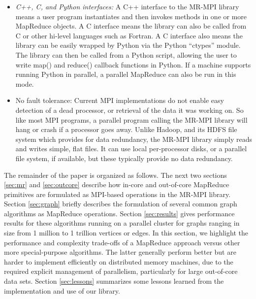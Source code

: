 \begin{itemize}
\item {\it C++, C, and Python interfaces:} A C++ interface to the
MR-MPI library means a user program instantiates and then invokes
methods in one or more MapReduce objects.  A C interface means the
library can also be called from C or other hi-level languages such as
Fortran.  A C interface also means the library can be easily wrapped
by Python via the Python ``ctypes'' module.  The library can then be
called from a Python script, allowing the user to write map() and
reduce() callback functions in Python.  If a machine supports running
Python in parallel, a parallel MapReduce can also be run in this mode.

\item {No fault tolerance:} Current MPI implementations do not enable
easy detection of a dead processor, or retrieval of the data it was
working on.  So like most MPI programs, a parallel program calling the
MR-MPI library will hang or crash if a processor goes away.  Unlike
Hadoop, and its HDFS file system which provides for data redundancy,
the MR-MPI library simply reads and writes simple, flat files.  It can
use local per-processor disks, or a parallel file system, if
available, but these typically provide no data redundancy.

\end{itemize}

The remainder of the paper is organized as follows.  The next two
sections \ref{sec:mr} and \ref{sec:outcore} describe how in-core and
out-of-core MapReduce primitives are formulated as MPI-based
operations in the MR-MPI library.  Section \ref{sec:graph} briefly
describes the formulation of several common graph algorithms as
MapReduce operations.  Section \ref{sec:results} gives performance
results for these algorithms running on a parallel cluster for graphs
ranging in size from 1 million to 1 trillion vertices or edges.  In
this section, we highlight the performance and complexity trade-offs
of a MapReduce approach versus other more special-purpose algorithms.
The latter generally perform better but are harder to implement
efficiently on distributed memory machines, due to the required
explicit management of parallelism, particularly for large out-of-core
data sets.  Section \ref{sec:lessons} summarizes some lessons learned
from the implementation and use of our library.
